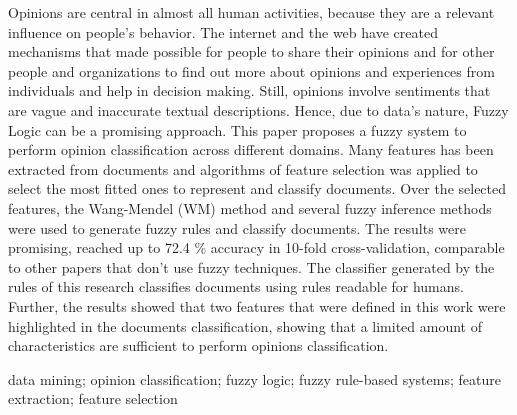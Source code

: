 \documentclass[msc, a4paper, classic, pt]{ufbathesis}
\begin{document}

\abstract
Opinions are central in almost all human activities, because they are a relevant influence on people’s behavior. The internet and the web have created mechanisms that made possible for people to share their opinions and for other people and organizations to find out more about opinions and experiences from individuals and help in decision making. Still, opinions involve sentiments that are vague and inaccurate textual descriptions. Hence, due to data's nature, Fuzzy Logic can be a promising approach. This paper proposes a fuzzy system to perform opinion classification across different domains. Many features has been extracted from documents and algorithms of feature selection was applied to select the most fitted ones to represent and classify documents. Over the selected features, the Wang-Mendel (WM) method and several fuzzy inference methods were used to generate fuzzy rules and classify documents. The results were promising, reached up to 72.4 \% accuracy in 10-fold cross-validation, comparable to other papers that don't use fuzzy techniques. The classifier generated by the rules of this research classifies documents using rules readable for humans. Further, the results showed that two features that were defined in this work were highlighted in the documents classification, showing that a limited amount of characteristics are sufficient to perform opinions classification.
\begin{keywords}
data mining; opinion classification; fuzzy logic; fuzzy rule-based systems; feature extraction; feature selection
\end{keywords}

\tableofcontents

\listoffigures

\listoftables

\mainmatter
\end{document}
